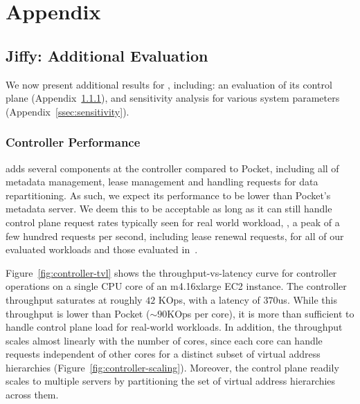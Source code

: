 \chapter{Appendix}

\section{Jiffy: Additional Evaluation}
\label{sec:appendix}


We now present additional results for \jiffy, including: an evaluation of its control plane (Appendix~\ref{ssec:controller-scale}), and sensitivity analysis for various system parameters (Appendix~\ref{ssec:sensitivity}).

\subsection{Controller Performance}
\label{ssec:controller-scale}

\name adds several components at the controller compared to Pocket, including all of metadata management, lease management and handling requests for data repartitioning. As such, we expect its performance to be lower than Pocket's metadata server. We deem this to be acceptable as long as it can still handle control plane request rates typically seen for real world workload, \eg, a peak of a few hundred requests per second, including lease renewal requests, for all of our evaluated workloads and those evaluated in~\cite{pocket}.

Figure~\ref{fig:controller-tvl} shows the throughput-vs-latency curve for \name controller operations on a single CPU core of an m4.16xlarge EC2 instance. The controller throughput saturates at roughly $42$ KOps, with a latency of $370$us. While this throughput is lower than Pocket ($\sim 90$KOps per core), it is more than sufficient to handle control plane load for real-world workloads. In addition, the throughput scales almost linearly with the number of cores, since each core can handle requests independent of other cores for a distinct subset of virtual address hierarchies (Figure~\ref{fig:controller-scaling}). Moreover, the \name control plane readily scales to multiple servers by partitioning the set of virtual address hierarchies across them.

